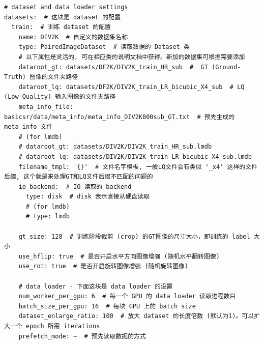 \documentclass[../main.tex]{subfiles}
\begin{document}
\begin{verbatim}
# dataset and data loader settings
datasets:  # 这块是 dataset 的配置
  train:  # 训练 dataset 的配置
    name: DIV2K  # 自定义的数据集名称
    type: PairedImageDataset  # 读取数据的 Dataset 类
    # 以下属性是灵活的, 可在相应类的说明文档中获得。新加的数据集可根据需要添加
    dataroot_gt: datasets/DF2K/DIV2K_train_HR_sub  #  GT (Ground-Truth) 图像的文件夹路径
    dataroot_lq: datasets/DF2K/DIV2K_train_LR_bicubic_X4_sub  # LQ (Low-Quality) 输入图像的文件夹路径
    meta_info_file: basicsr/data/meta_info/meta_info_DIV2K800sub_GT.txt  # 预先生成的 meta_info 文件
    # (for lmdb)
    # dataroot_gt: datasets/DIV2K/DIV2K_train_HR_sub.lmdb
    # dataroot_lq: datasets/DIV2K/DIV2K_train_LR_bicubic_X4_sub.lmdb
    filename_tmpl: '{}'  # 文件名字模板, 一般LQ文件会有类似 '_x4' 这样的文件后缀, 这个就是来处理GT和LQ文件后缀不匹配的问题的
    io_backend:  # IO 读取的 backend
      type: disk  # disk 表示直接从硬盘读取
      # (for lmdb)
      # type: lmdb

    gt_size: 128  # 训练阶段裁剪 (crop) 的GT图像的尺寸大小，即训练的 label 大小
    use_hflip: true  # 是否开启水平方向图像增强 (随机水平翻转图像)
    use_rot: true  # 是否开启旋转图像增强 (随机旋转图像)

    # data loader - 下面这块是 data loader 的设置
    num_worker_per_gpu: 6  # 每一个 GPU 的 data loader 读取进程数目
    batch_size_per_gpu: 16  # 每块 GPU 上的 batch size
    dataset_enlarge_ratio: 100  # 放大 dataset 的长度倍数 (默认为1)。可以扩大一个 epoch 所需 iterations
    prefetch_mode: ~  # 预先读取数据的方式
\end{verbatim}
\end{document}
